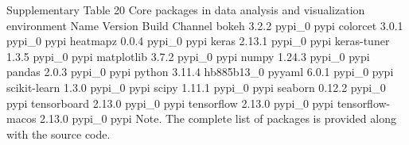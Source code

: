 Supplementary Table 20
Core packages in data analysis and visualization environment
Name	Version	Build	Channel
bokeh	3.2.2	pypi_0	pypi
colorcet	3.0.1	pypi_0	pypi
heatmapz	0.0.4	pypi_0	pypi
keras	2.13.1	pypi_0	pypi
keras-tuner	1.3.5	pypi_0	pypi
matplotlib	3.7.2	pypi_0	pypi
numpy	1.24.3	pypi_0	pypi
pandas	2.0.3	pypi_0	pypi
python	3.11.4	hb885b13_0
pyyaml	6.0.1	pypi_0	pypi
scikit-learn	1.3.0	pypi_0	pypi
scipy	1.11.1	pypi_0	pypi
seaborn	0.12.2	pypi_0	pypi
tensorboard	2.13.0	pypi_0	pypi
tensorflow	2.13.0	pypi_0	pypi
tensorflow-macos	2.13.0	pypi_0	pypi
Note. The complete list of packages is provided along with the source code.
